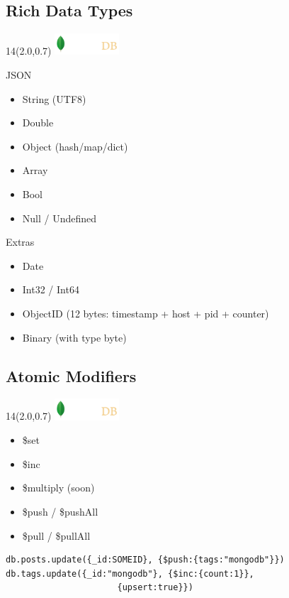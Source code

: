 \documentclass{beamer}
\newcommand{\MongoLogo}{
\begin{textblock}{14}(2.0,0.7)
  \includegraphics[height=0.8cm]{logo-mongodb-ondark.png}
\end{textblock}
}
\begin{document}
\subsection{Rich Data Types}
\begin{frame}[fragile]
  \MongoLogo
  \begin{block}{JSON}
  \begin{itemize}
    \item String (UTF8)
    \item Double
    \item Object (hash/map/dict)
    \item Array
    \item Bool
    \item Null / Undefined
  \end{itemize}
  \end{block}

  \begin{block}{Extras}
  \begin{itemize}
    \item Date
    \item Int32 / Int64
    \item ObjectID (12 bytes: timestamp + host + pid + counter)
    \item Binary (with type byte)
  \end{itemize}
  \end{block}
\end{frame}

  
\subsection{Atomic Modifiers}
\begin{frame}[fragile]
  \MongoLogo
  \begin{itemize}
    \item \$set
    \item \$inc
    \item \$multiply (soon)
    \item \$push / \$pushAll
    \item \$pull / \$pullAll
  \end{itemize}


    \begin{small}
    \begin{verbatim}
db.posts.update({_id:SOMEID}, {$push:{tags:"mongodb"}})
db.tags.update({_id:"mongodb"}, {$inc:{count:1}},
                      {upsert:true}})
    \end{verbatim}
    \end{small}
\end{frame}
\end{document}
